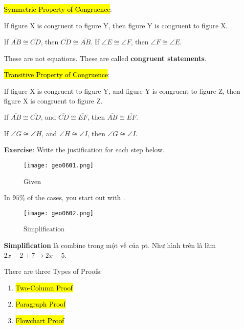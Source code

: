 \hl{Symmetric Property of Congruence}:

If figure X is congruent to figure Y, then figure Y is congruent to figure X.

If $\overline{AB} \cong \overline{CD}$, then $\overline{CD} \cong \overline{AB}$. If $\angle E \cong \angle F$, then $\angle F \cong \angle E$.

These are not equations. These are called \textbf{congruent statements}.

\hl{Transitive Property of Congruence}:

If figure X is congruent to figure Y, and figure Y is congruent to figure Z, then figure X is congruent to figure Z.

If $\overline{AB} \cong \overline{CD}$, and $\overline{CD} \cong \overline{EF}$, then $\overline{AB} \cong \overline{EF}$.

If $\angle G \cong \angle H$, and $\angle H \cong \angle I$, then $\angle G \cong \angle I$.

\vspace{.5cm}

\textbf{Exercise}: Write the justification for each step below.

\begin{figure}[htb!]
  \centering
  \texttt{[image: geo0601.png]}
  \caption{Given}
\end{figure}

In $95\%$ of the cases, you start out with .

\begin{figure}[htb!]
  \centering
  \texttt{[image: geo0602.png]}
  \caption{Simplification}
\end{figure}

\textbf{Simplification} là combine trong một vế của pt. Như hình trên là làm $2x-2+7 \rightarrow 2x+5$.

\vspace{.5cm}

There are three Types of Proofs:

\begin{enumerate}
  \item \hl{Two-Column Proof}
  \item \hl{Paragraph Proof}
  \item \hl{Flowchart Proof}
\end{enumerate}


